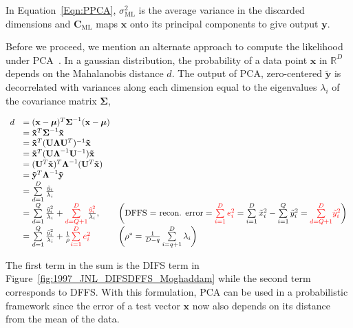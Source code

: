 In Equation~\ref{Eqn:PPCA}, $\sigma^2_{\textrm{ML}}$ is the average variance in the discarded dimensions and $\mathbf{C}_{\textrm{ML}}$ maps $\mathbf{x}$ onto its principal components to give output $\mathbf{y}$.

Before we proceed, we mention an alternate approach to compute the likelihood under PCA~\cite{1997_JNL_EigenTRK_Moghaddam}.  In a gaussian distribution, the probability of a data point $\mathbf{x}$ in $\mathbb{R}^D$ depends on the Mahalanobis distance $d$.  The output of PCA, zero-centered $\mathbf{\tilde{y}}$ is decorrelated with variances along each dimension equal to the eigenvalues $\lambda_i$ of the covariance matrix $\boldsymbol\Sigma$,


\begin{equation}
\begin{array}{lllllll}
d &= (\mathbf{x}-\boldsymbol\mu)^T\boldsymbol\Sigma^{-1}(\mathbf{x}-\boldsymbol\mu)\\
&=\mathbf{\tilde{x}}^T\boldsymbol\Sigma^{-1}\mathbf{\tilde{x}}\\
&=\mathbf{\tilde{x}}^T(\mathbf{U}\boldsymbol\Lambda\mathbf{U}^T)^{-1}\mathbf{\tilde{x}}\\
&=\mathbf{\tilde{x}}^T(\mathbf{U}\boldsymbol\Lambda^{-1}\mathbf{U}^{-1})\mathbf{\tilde{x}}\\
&=(\mathbf{U}^T\mathbf{\tilde{x}})^T\boldsymbol\Lambda^{-1}(\mathbf{U}^T\mathbf{\tilde{x}})	\\
&=\mathbf{\tilde{y}}^T\boldsymbol\Lambda^{-1}\mathbf{\tilde{y}}\\
&=\sum\limits_{d=1}^D \frac{\tilde{y}_i}{\lambda_i}\\
&=\sum\limits_{d=1}^Q \frac{\tilde{y}_i^2}{\lambda_i} + {\color{red}\sum\limits_{d=Q+1}^D} \frac{{\color{red}\tilde{y}_i^2}}{\lambda_i}, \ \ \  & \bigg(\textrm{DFFS = recon. error}={\color{red}\sum\limits_{i=1}^D e_i^2} = \sum\limits_{i=1}^D \tilde{x}_i^2 - \sum\limits_{i=1}^Q \tilde{y}_i^2= {\color{red}\sum\limits_{d=Q+1}^D} {\color{red}\tilde{y}_i^2}\bigg)\\
&=\sum\limits_{d=1}^Q \frac{\tilde{y}_i^2}{\lambda_i} + \frac{1}{\rho} {\color{red}\sum\limits_{i=1}^D e_i^2} \ \ \ & \bigg(\rho^* = \frac{1}{D-q}\sum\limits_{i=q+1}^D \lambda_i\bigg)\\
\end{array}
\label{Eqn:MoghaddamLikelihood}
\end{equation}

The first term in the sum is the DIFS term in Figure~\ref{fig:1997_JNL_DIFSDFFS_Moghaddam} while the second term corresponds to DFFS.  With this formulation, PCA can be used in a probabilistic framework since the error of a test vector $\mathbf{x}$ now also depends on its distance from the mean of the data.


